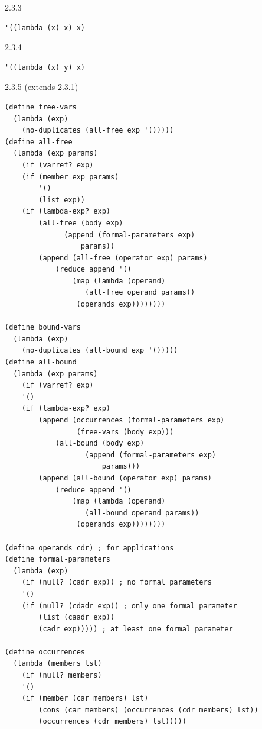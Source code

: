 \documentclass[11pt]{article}
\begin{document}
2.3.3
\begin{lstlisting}
'((lambda (x) x) x)
\end{lstlisting}

2.3.4
\begin{lstlisting}
'((lambda (x) y) x)
\end{lstlisting}

2.3.5 (extends 2.3.1)
\begin{lstlisting}
(define free-vars
  (lambda (exp)
    (no-duplicates (all-free exp '()))))
(define all-free
  (lambda (exp params)
    (if (varref? exp)
	(if (member exp params)
	    '()
	    (list exp))
	(if (lambda-exp? exp)
	    (all-free (body exp)
		      (append (formal-parameters exp)
			      params))
	    (append (all-free (operator exp) params)
		    (reduce append '()
			    (map (lambda (operand)
				   (all-free operand params))
				 (operands exp))))))))

(define bound-vars
  (lambda (exp)
    (no-duplicates (all-bound exp '()))))
(define all-bound
  (lambda (exp params)
    (if (varref? exp)
	'()
	(if (lambda-exp? exp)
	    (append (occurrences (formal-parameters exp)
				 (free-vars (body exp)))
		    (all-bound (body exp)
			       (append (formal-parameters exp)
				       params)))
	    (append (all-bound (operator exp) params)
		    (reduce append '()
			    (map (lambda (operand)
				   (all-bound operand params))
				 (operands exp))))))))
  
(define operands cdr) ; for applications
(define formal-parameters
  (lambda (exp)
    (if (null? (cadr exp)) ; no formal parameters
	'()
	(if (null? (cdadr exp)) ; only one formal parameter
	    (list (caadr exp))
	    (cadr exp))))) ; at least one formal parameter

(define occurrences
  (lambda (members lst)
    (if (null? members)
	'()
	(if (member (car members) lst)
	    (cons (car members) (occurrences (cdr members) lst))
	    (occurrences (cdr members) lst)))))
\end{lstlisting}
\end{document}
